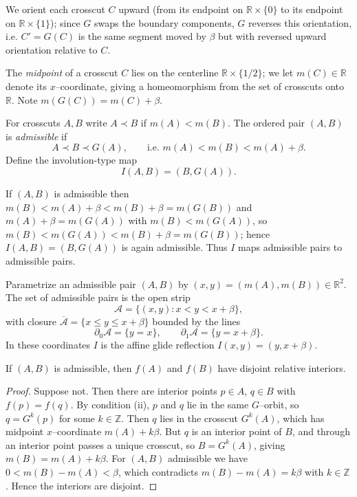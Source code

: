 We orient each crosscut $C$ upward (from its endpoint on $\mathbb{R}\times\{0\}$
to its endpoint on $\mathbb{R}\times\{1\}$); since $G$ swaps the boundary
components, $G$ reverses this orientation, i.e. $C'=G(C)$ is the same segment
moved by $\beta$ but with reversed upward orientation relative to $C$.

The \emph{midpoint} of a crosscut $C$ lies on the centerline
$\mathbb{R}\times\{1/2\}$; we let $m(C)\in\mathbb{R}$ denote its $x$--coordinate,
giving a homeomorphism from the set of crosscuts onto $\mathbb{R}$.
Note $m(G(C))=m(C)+\beta$.

\begin{definition}
For crosscuts $A,B$ write $A\prec B$ if $m(A)<m(B)$. The ordered pair $(A,B)$ is
\emph{admissible} if
\[
A\prec B\prec G(A),\qquad\text{i.e. } m(A)<m(B)<m(A)+\beta .
\]
Define the involution-type map
\[
I(A,B)=(B,G(A)).
\]
\end{definition}

If $(A,B)$ is admissible then $m(B)<m(A)+\beta<m(B)+\beta=m(G(B))$ and
$m(A)+\beta=m(G(A))$ with $m(B)<m(G(A))$, so $m(B)<m(G(A))<m(B)+\beta=m(G(B))$;
hence $I(A,B)=(B,G(A))$ is again admissible. Thus $I$ maps admissible pairs to
admissible pairs.

Parametrize an admissible pair $(A,B)$ by $(x,y)=(m(A),m(B))\in\mathbb{R}^2$.
The set of admissible pairs is the open strip
\[
\mathcal{A}=\{(x,y):x<y<x+\beta\},
\]
with closure $\overline{\mathcal{A}}=\{x\le y\le x+\beta\}$ bounded by the lines
\[
\partial_0\mathcal{A}=\{y=x\},\qquad \partial_1\mathcal{A}=\{y=x+\beta\}.
\]
In these coordinates $I$ is the affine glide reflection
$I(x,y)=(y,x+\beta)$.

\begin{lemma}\label{adm}
If $(A,B)$ is admissible, then $f(A)$ and $f(B)$ have disjoint relative interiors.
\end{lemma}

\begin{proof}
Suppose not. Then there are interior points $p\in A$, $q\in B$ with $f(p)=f(q)$.
By condition (ii), $p$ and $q$ lie in the same $G$--orbit, so $q=G^k(p)$ for some
$k\in\mathbb{Z}$. Then $q$ lies in the crosscut $G^k(A)$, which has midpoint
$x$--coordinate $m(A)+k\beta$. But $q$ is an interior point of $B$, and through an
interior point passes a unique crosscut, so $B=G^k(A)$, giving $m(B)=m(A)+k\beta$.
For $(A,B)$ admissible we have $0<m(B)-m(A)<\beta$, which contradicts
$m(B)-m(A)=k\beta$ with $k\in\mathbb{Z}$. Hence the interiors are disjoint.
\end{proof}

